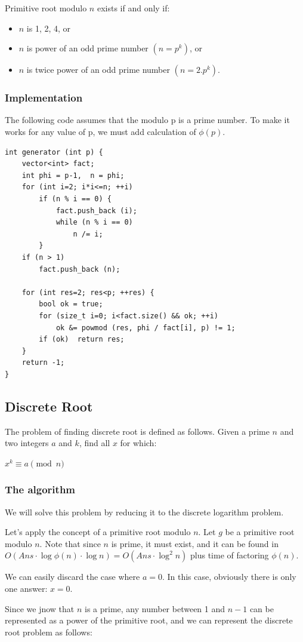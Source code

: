 \documentclass[8pt, a4paper, oneside, twocolumn]{extarticle}
\begin{document}
Primitive root modulo $n$ exists if and only if:
\begin{itemize}
    \item $n$ is 1, 2, 4, or
    \item $n$ is power of an odd prime number $(n = p^k)$, or
    \item $n$ is twice power of an odd prime number $(n = 2 . p^k)$.
\end{itemize}
\subsubsection{Implementation}
The following code assumes that the modulo p is a prime number. To make it works for any value of p, we must add calculation of $\phi (p)$.
\begin{verbatim}
int generator (int p) {
	vector<int> fact;
	int phi = p-1,  n = phi;
	for (int i=2; i*i<=n; ++i)
		if (n % i == 0) {
			fact.push_back (i);
			while (n % i == 0)
				n /= i;
		}
	if (n > 1)
		fact.push_back (n);
 
	for (int res=2; res<p; ++res) {
		bool ok = true;
		for (size_t i=0; i<fact.size() && ok; ++i)
			ok &= powmod (res, phi / fact[i], p) != 1;
		if (ok)  return res;
	}
	return -1;
}
\end{verbatim}
\subsection{Discrete Root}

The problem of finding discrete root is defined as follows. Given a prime $n$ and two integers $a$ and $k$, find all $x$ for which:

$x^k \equiv a \pmod n$
\subsubsection{The algorithm}

We will solve this problem by reducing it to the discrete logarithm problem.

Let's apply the concept of a primitive root modulo $n$. Let $g$ be a primitive root modulo $n$. Note that since $n$ is prime, it must exist, and it can be found in $O(Ans \cdot \log \phi (n) \cdot \log n) = O(Ans \cdot \log^2 n)$ plus time of factoring $\phi (n)$.

We can easily discard the case where $a = 0$. In this case, obviously there is only one answer: $x = 0$.

Since we jnow that $n$ is a prime, any number between 1 and $n-1$ can be represented as a power of the primitive root, and we can represent the discrete root problem as follows:
\end{document}
